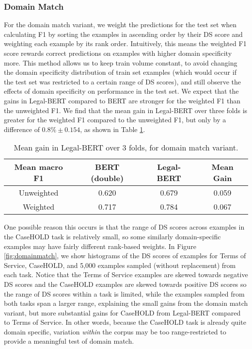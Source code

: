 \documentclass[sigconf]{acmart}
\begin{document}
\subsubsection{Domain Match}
For the domain match variant, we weight the predictions for the test set when calculating F1 by sorting the examples in ascending order by their DS score and weighting each example by its rank order. Intuitively, this means the weighted F1 score rewards correct predictions on examples with higher domain specificity more. This method allows us to keep train volume constant, to avoid changing the domain specificity distribution of train set examples (which would occur if the test set was restricted to a certain range of DS scores), and still observe the effects of domain specificity on performance in the test set. We expect that the gains in Legal-BERT compared to BERT are stronger for the weighted F1 than the unweighted F1. We find that the mean gain in Legal-BERT over three folds is greater for the weighted F1 compared to the unweighted F1, but only by a difference of $0.8\% \pm 0.154$, as shown in Table \ref{tab:domainmatch}.

\begin{table}[ht]
    \centering
    \small
    \caption{Mean gain in Legal-BERT over 3 folds, for domain match variant.}
    \vspace{-0.15in}
    \begin{tabular}{cccc}
         \toprule
         Mean macro F1 & BERT (double) & Legal-BERT & Mean Gain \\
         \midrule
         Unweighted & 0.620 & 0.679 & 0.059 \\
         Weighted & 0.717 & 0.784 & 0.067 \\
         \bottomrule
    \end{tabular}
    \label{tab:domainmatch}
\end{table}

One possible reason this occurs is that the range of DS scores across examples in the CaseHOLD task is relatively small, so some similarly domain-specific examples may have fairly different rank-based weights. In Figure \ref{fig:domainmatch}, we show histograms of the DS scores of examples for Terms of Service, CaseHOLD, and 5,000 examples sampled (without replacement) from each task. Notice that the Terms of Service examples are skewed towards negative DS scores and the CaseHOLD examples are skewed towards positive DS scores so the range of DS scores within a task is limited, while the examples sampled from both tasks span a larger range, explaining the small gains from the domain match variant, but more substantial gains for CaseHOLD from Legal-BERT compared to Terms of Service. In other words, because the CaseHOLD task is already quite domain specific, variation \emph{within} the corpus may be too range-restricted to provide a meaningful test of domain match.
\end{document}
